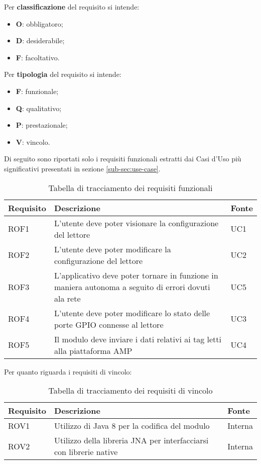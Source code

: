 Per \textbf{classificazione} del requisito si intende:
\begin{itemize}
    \item \textbf{O}: obbligatoro;
    \item \textbf{D}: desiderabile;
    \item \textbf{F}: facoltativo.
\end{itemize}

Per \textbf{tipologia} del requisito si intende:
\begin{itemize}
    \item \textbf{F}: funzionale;
    \item \textbf{Q}: qualitativo;
    \item \textbf{P}: prestazionale;
    \item \textbf{V}: vincolo.
\end{itemize}

Di seguito sono riportati solo i requisiti funzionali estratti dai Casi d'Uso più significativi presentati in sezione \ref{sub-sec:use-case}.
\begin{table}[h!]
    \label{tab:requisiti-fun}
    \begin{tabularx}{\textwidth}{ | X | X | X |}
    \hline
    \textbf{Requisito} & \textbf{Descrizione} & \textbf{Fonte}\\
    \hline
    ROF1 & L'utente deve poter visionare la configurazione del lettore & UC1 \\
    \hline
    ROF2 & L'utente deve poter modificare la configurazione del lettore & UC2 \\
    \hline
    ROF3 & L'applicativo deve poter tornare in funzione in maniera autonoma a seguito di errori dovuti ala rete & UC5 \\
    \hline
    ROF4 & L'utente deve poter modificare lo stato delle porte GPIO connesse al lettore & UC3 \\
    \hline
    ROF5 & Il modulo deve inviare i dati relativi ai tag letti alla piattaforma AMP & UC4 \\
    \hline
    \end{tabularx}
    \caption{Tabella di tracciamento dei requisiti funzionali}
\end{table}

Per quanto riguarda i requisiti di vincolo:
\begin{table}[h!]
    \label{tab:requisiti-vinc}
    \begin{tabularx}{\textwidth}{ | X | X | X |}
    \hline
    \textbf{Requisito} & \textbf{Descrizione} & \textbf{Fonte}\\
    \hline
    ROV1 & Utilizzo di Java 8 per la codifica del modulo & Interna \\
    \hline
    ROV2 & Utilizzo della libreria JNA per interfacciarsi con librerie native & Interna \\
    \hline
    \end{tabularx}
    \caption{Tabella di tracciamento dei requisiti di vincolo}
\end{table}

